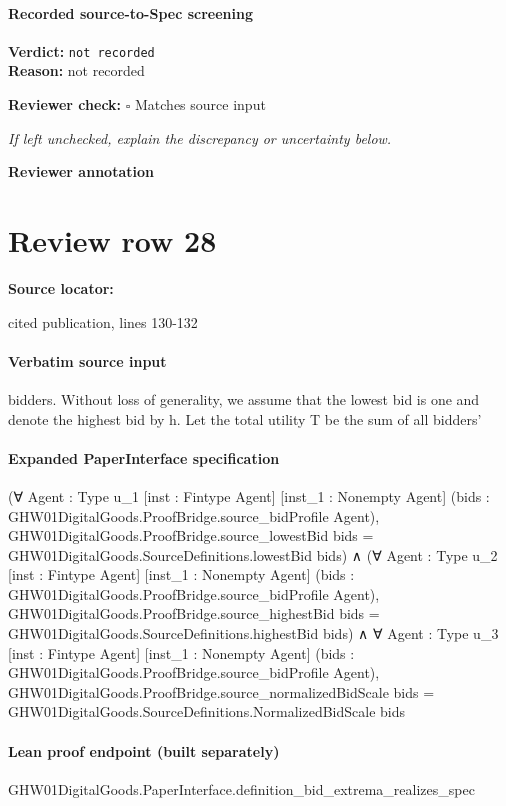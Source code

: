 \documentclass[10pt]{article}
\newcommand{\reviewerbox}{%
  \par\noindent\fbox{\parbox{0.96\linewidth}{\rule{0pt}{0.38in}}}\par
}
\newcommand{\reviewmatch}[1]{%
  \par\noindent\textbf{Reviewer check:} $\square$\; #1\par
  \noindent\emph{If left unchecked, explain the discrepancy or uncertainty below.}\par
}
\begin{document}
\paragraph{Recorded source-to-Spec screening}
\textbf{Verdict:} \texttt{not recorded}
\\
\textbf{Reason:} not recorded
\reviewmatch{Matches source input}
\noindent\textbf{Reviewer annotation}\par
\reviewerbox
\clearpage
\hypertarget{source-claim-df5235958b6d7ea9}{}
\section*{Review row 28}
\textbf{Source locator:} {\footnotesize\raggedright cited publication, lines 130-\allowbreak{}132\par}
\paragraph{Verbatim source input}
\begin{ReviewVerbatim}
bidders. Without loss of generality, we assume that
the lowest bid is one and denote the highest bid by
h. Let the total utility T be the sum of all bidders’
\end{ReviewVerbatim}


\paragraph{Expanded PaperInterface specification}
\begin{ReviewVerbatim}
(∀ {Agent : Type u_1} [inst : Fintype Agent] [inst_1 : Nonempty Agent]
    (bids : GHW01DigitalGoods.ProofBridge.source_bidProfile Agent),
    GHW01DigitalGoods.ProofBridge.source_lowestBid bids = GHW01DigitalGoods.SourceDefinitions.lowestBid bids) ∧
  (∀ {Agent : Type u_2} [inst : Fintype Agent] [inst_1 : Nonempty Agent]
      (bids : GHW01DigitalGoods.ProofBridge.source_bidProfile Agent),
      GHW01DigitalGoods.ProofBridge.source_highestBid bids = GHW01DigitalGoods.SourceDefinitions.highestBid bids) ∧
    ∀ {Agent : Type u_3} [inst : Fintype Agent] [inst_1 : Nonempty Agent]
      (bids : GHW01DigitalGoods.ProofBridge.source_bidProfile Agent),
      GHW01DigitalGoods.ProofBridge.source_normalizedBidScale bids =
        GHW01DigitalGoods.SourceDefinitions.NormalizedBidScale bids
\end{ReviewVerbatim}

\paragraph{Lean proof endpoint (built separately)}\begin{ReviewVerbatim}
GHW01DigitalGoods.PaperInterface.definition_bid_extrema_realizes_spec
\end{ReviewVerbatim}
\end{document}
